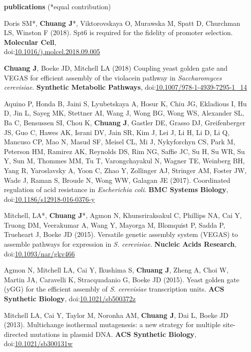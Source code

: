 \documentclass[11pt, a4paper]{article}
\begin{document}
\vspace{2em}
\textbf{\Large publications} (*equal contribution)
\begin{description}[topsep=2pt, align=right, leftmargin=!, labelwidth=\widthof{\textbf{2018}}]
    \item [2018] Doris SM*, \textbf{Chuang J}*, Viktorovskaya O, Murawska M, Spatt D, Churchman LS, Winston F (2018). Spt6 is required for the fidelity of promoter selection. \textbf{Molecular Cell},\\doi:\href{https://doi.org/10.1016/j.molcel.2018.09.005}{10.1016/j.molcel.2018.09.005}
    \item [2018] \textbf{Chuang J}, Boeke JD, Mitchell LA (2018) Coupling yeast golden gate and VEGAS for efficient assembly of the violacein pathway in \textit{Saccharomyces cerevisiae}. \textbf{Synthetic Metabolic Pathways}, doi:\href{https://doi.org/10.1007/978-1-4939-7295-1_14}{10.1007/978-1-4939-7295-1\_14}
    \item [2017] Aquino P, Honda B, Jaini S, Lyubetskaya A, Hosur K, Chiu JG, Ekladious I, Hu D, Jin L, Sayeg MK, Stettner AI, Wang J, Wong BG, Wong WS, Alexander SL, Ba C, Bensussen SI, Chou K, \textbf{Chuang J}, Gastler DE, Grasso DJ, Greifenberger JS, Guo C, Hawes AK, Israni DV, Jain SR, Kim J, Lei J, Li H, Li D, Li Q, Mancuso CP, Mao N, Masud SF, Meisel CL, Mi J, Nykyforchyn CS, Park M, Peterson HM, Ramirez AK, Reynolds DS, Rim NG, Saffie JC, Su H, Su WR, Su Y, Sun M, Thommes MM, Tu T, Varongchayakul N, Wagner TE, Weinberg BH, Yang R, Yaroslavsky A, Yoon C, Zhao Y, Zollinger AJ, Stringer AM, Foster JW, Wade J, Raman S, Broude N, Wong WW, Galagan JE (2017). Coordinated regulation of acid resistance in \textit{Escherichia coli}. \textbf{BMC Systems Biology}, doi:\href{https://doi.org/10.1186/s12918-016-0376-y}{10.1186/s12918-016-0376-y}
    \item [2015] Mitchell, LA*, \textbf{Chuang J}*, Agmon N, Khunsriraksakul C, Phillips NA, Cai Y, Truong DM, Veerakumar A, Wang Y, Mayorga M, Blomquist P, Sadda P, Trueheart J, Boeke JD (2015). Versatile genetic assembly system (VEGAS) to assemble pathways for expression in \textit{S. cerevisiae}. \textbf{Nucleic Acids Research}, doi:\href{https://doi.org/10.1093/nar/gkv466}{10.1093/nar/gkv466}
    \item [2015] Agmon N, Mitchell LA, Cai Y, Ikushima S, \textbf{Chuang J}, Zheng A, Choi W, Martin JA, Caravelli K, Stracquadanio G, Boeke JD (2015). Yeast golden gate (yGG) for the efficient assembly of \textit{S. cerevisiae} transcription units. \textbf{ACS Synthetic Biology}, doi:\href{https://doi.org/10.1021/sb500372z}{10.1021/sb500372z}
    \item [2013] Mitchell LA, Cai Y, Taylor M, Noronha AM, \textbf{Chuang J}, Dai L, Boeke JD (2013). Multichange isothermal mutagenesis: a new strategy for multiple site-directed mutations in plasmid DNA. \textbf{ACS Synthetic Biology}, doi:\href{https://doi.org/10.1021/sb300131w}{10.1021/sb300131w}
\end{description}
\end{document}
